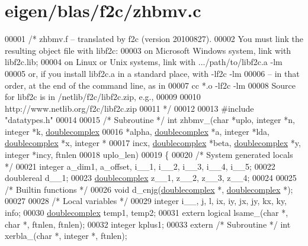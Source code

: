 \hypertarget{eigen_2blas_2f2c_2zhbmv_8c_source}{}\section{eigen/blas/f2c/zhbmv.c}
\label{eigen_2blas_2f2c_2zhbmv_8c_source}

\begin{DoxyCode}
00001 \textcolor{comment}{/* zhbmv.f -- translated by f2c (version 20100827).}
00002 \textcolor{comment}{   You must link the resulting object file with libf2c:}
00003 \textcolor{comment}{    on Microsoft Windows system, link with libf2c.lib;}
00004 \textcolor{comment}{    on Linux or Unix systems, link with .../path/to/libf2c.a -lm}
00005 \textcolor{comment}{    or, if you install libf2c.a in a standard place, with -lf2c -lm}
00006 \textcolor{comment}{    -- in that order, at the end of the command line, as in}
00007 \textcolor{comment}{        cc *.o -lf2c -lm}
00008 \textcolor{comment}{    Source for libf2c is in /netlib/f2c/libf2c.zip, e.g.,}
00009 \textcolor{comment}{}
00010 \textcolor{comment}{        http://www.netlib.org/f2c/libf2c.zip}
00011 \textcolor{comment}{*/}
00012 
00013 \textcolor{preprocessor}{#include "datatypes.h"}
00014 
00015 \textcolor{comment}{/* Subroutine */} \textcolor{keywordtype}{int} zhbmv\_(\textcolor{keywordtype}{char} *uplo, integer *n, integer *k, \hyperlink{structdoublecomplex}{doublecomplex} 
00016     *alpha, \hyperlink{structdoublecomplex}{doublecomplex} *a, integer *lda, \hyperlink{structdoublecomplex}{doublecomplex} *x, integer *
00017     incx, \hyperlink{structdoublecomplex}{doublecomplex} *beta, \hyperlink{structdoublecomplex}{doublecomplex} *y, integer *incy, ftnlen 
00018     uplo\_len)
00019 \{
00020     \textcolor{comment}{/* System generated locals */}
00021     integer a\_dim1, a\_offset, i\_\_1, i\_\_2, i\_\_3, i\_\_4, i\_\_5;
00022     doublereal d\_\_1;
00023     \hyperlink{structdoublecomplex}{doublecomplex} z\_\_1, z\_\_2, z\_\_3, z\_\_4;
00024 
00025     \textcolor{comment}{/* Builtin functions */}
00026     \textcolor{keywordtype}{void} d\_cnjg(\hyperlink{structdoublecomplex}{doublecomplex} *, \hyperlink{structdoublecomplex}{doublecomplex} *);
00027 
00028     \textcolor{comment}{/* Local variables */}
00029     integer i\_\_, j, l, ix, iy, jx, jy, kx, ky, info;
00030     \hyperlink{structdoublecomplex}{doublecomplex} temp1, temp2;
00031     \textcolor{keyword}{extern} logical lsame\_(\textcolor{keywordtype}{char} *, \textcolor{keywordtype}{char} *, ftnlen, ftnlen);
00032     integer kplus1;
00033     \textcolor{keyword}{extern} \textcolor{comment}{/* Subroutine */} \textcolor{keywordtype}{int} xerbla\_(\textcolor{keywordtype}{char} *, integer *, ftnlen);

\end{DoxyCode}
